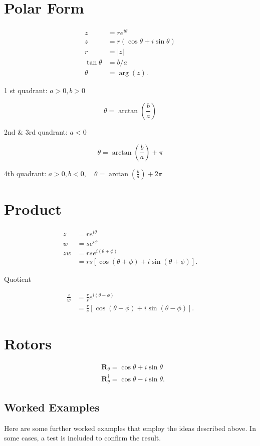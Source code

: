 \documentclass[10pt]{article}
\begin{document}
\section{Polar Form}
$$
\begin{aligned}
z & =r e^{i \theta} \\
z & =r(\cos \theta+i \sin \theta) \\
r & =|z| \\
\tan \theta & =b / a \\
\theta & =\arg (z) .
\end{aligned}
$$

1 st quadrant: $a>0, b>0$

$$
\theta=\arctan \left(\frac{b}{a}\right)
$$

2nd \& 3rd quadrant: $a<0$

$$
\theta=\arctan \left(\frac{b}{a}\right)+\pi
$$

4th quadrant: $a>0, b<0, \quad \theta=\arctan \left(\frac{b}{a}\right)+2 \pi$

\section{Product}
$$
\begin{aligned}
z & =r e^{i \theta} \\
w & =s e^{i \phi} \\
z w & =r s e^{i(\theta+\phi)} \\
& =r s[\cos (\theta+\phi)+i \sin (\theta+\phi)] .
\end{aligned}
$$

Quotient

$$
\begin{aligned}
\frac{z}{w} & =\frac{r}{s} e^{i(\theta-\phi)} \\
& =\frac{r}{s}[\cos (\theta-\phi)+i \sin (\theta-\phi)] .
\end{aligned}
$$

\section{Rotors}
$$
\begin{aligned}
& \mathbf{R}_{\theta}=\cos \theta+i \sin \theta \\
& \mathbf{R}_{\theta}^{\dagger}=\cos \theta-i \sin \theta .
\end{aligned}
$$

\subsection{Worked Examples}
Here are some further worked examples that employ the ideas described above. In some cases, a test is included to confirm the result.
\end{document}
